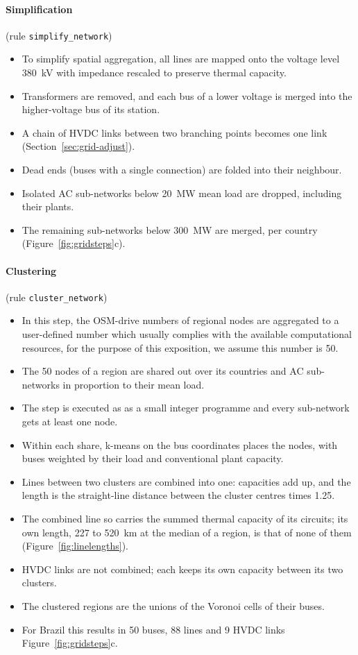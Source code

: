 \paragraph{Simplification} (rule \texttt{simplify\_network})
\begin{itemize}[nosep,leftmargin=*]
  \item To simplify spatial aggregation, all lines are mapped onto the voltage level \SI{380}{kV} with impedance rescaled to preserve thermal capacity.
  \item Transformers are removed, and each bus of a lower voltage is merged into the higher-voltage bus of its station.
  \item A chain of HVDC links between two branching points becomes one link (Section~\ref{sec:grid-adjust}).
  \item Dead ends (buses with a single connection) are folded into their neighbour.
  \item Isolated AC sub-networks below \SI{20}{MW} mean load are dropped, including their plants.
  \item The remaining sub-networks below \SI{300}{MW} are merged, per country (Figure~\ref{fig:gridsteps}c).
\end{itemize}

\paragraph{Clustering} (rule \texttt{cluster\_network})
\begin{itemize}[nosep,leftmargin=*]
  \item In this step, the OSM-drive numbers of regional nodes are aggregated to a user-defined number which usually complies with the available computational resources, for the purpose of this exposition, we assume this number is 50.
  \item The 50 nodes of a region are shared out over its countries and AC sub-networks in proportion to their mean load.
  \item The step is executed as as a small integer programme and every sub-network gets at least one node.
  \item Within each share, k-means on the bus coordinates places the nodes, with buses weighted by their load and conventional plant capacity.
  \item Lines between two clusters are combined into one: capacities add up, and the length is the straight-line distance between the cluster centres times 1.25.
  \item The combined line so carries the summed thermal capacity of its circuits; its own length, 227 to \SI{520}{km} at the median of a region, is that of none of them (Figure~\ref{fig:linelengths}).
  \item HVDC links are not combined; each keeps its own capacity between its two clusters.
  \item The clustered regions are the unions of the Voronoi cells of their buses.
  \item For Brazil this results in 50 buses, 88 lines and 9 HVDC links Figure~\ref{fig:gridsteps}c.
\end{itemize}

